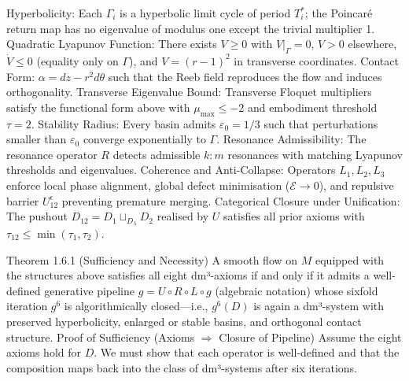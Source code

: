 Hyperbolicity: Each $  \Gamma_i  $ is a hyperbolic limit cycle of period $  T_i^*  $; the Poincaré return map has no eigenvalue of modulus one except the trivial multiplier 1.
Quadratic Lyapunov Function: There exists $  V \ge 0  $ with $  V|_{\Gamma} = 0  $, $  V > 0  $ elsewhere, $  \dot{V} \le 0  $ (equality only on $  \Gamma  $), and $  V = (r-1)^2  $ in transverse coordinates.
Contact Form: $  \alpha = dz - r^2 d\theta  $ such that the Reeb field reproduces the flow and induces orthogonality.
Transverse Eigenvalue Bound: Transverse Floquet multipliers satisfy the functional form above with $  \mu_{\max} \le -2  $ and embodiment threshold $  \tau = 2  $.
Stability Radius: Every basin admits $  \varepsilon_0 = 1/3  $ such that perturbations smaller than $  \varepsilon_0  $ converge exponentially to $  \Gamma  $.
Resonance Admissibility: The resonance operator $  R  $ detects admissible $  k:m  $ resonances with matching Lyapunov thresholds and eigenvalues.
Coherence and Anti-Collapse: Operators $  L_1, L_2, L_3  $ enforce local phase alignment, global defect minimisation ($  \mathcal{E} \to 0  $), and repulsive barrier $  U_{12}^\epsilon  $ preventing premature merging.
Categorical Closure under Unification: The pushout $  D_{12} = D_1 \sqcup_{D_\lambda} D_2  $ realised by $  U  $ satisfies all prior axioms with $  \tau_{12} \le \min(\tau_1, \tau_2)  $.

Theorem 1.6.1 (Sufficiency and Necessity)
A smooth flow on $  M  $ equipped with the structures above satisfies all eight dm³-axioms if and only if it admits a well-defined generative pipeline $  g = U \circ R \circ L \circ g  $ (algebraic notation) whose sixfold iteration $  g^6  $ is algorithmically closed—i.e., $  g^6(D)  $ is again a dm³-system with preserved hyperbolicity, enlarged or stable basins, and orthogonal contact structure.
Proof of Sufficiency (Axioms $  \Rightarrow  $ Closure of Pipeline)
Assume the eight axioms hold for $  D  $. We must show that each operator is well-defined and that the composition maps back into the class of dm³-systems after six iterations.

